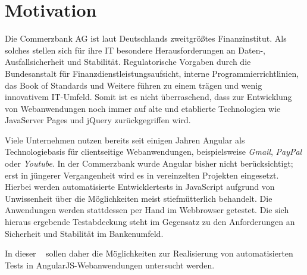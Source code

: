 \section{Motivation}\label{einleitung}
Die Commerzbank AG ist laut \textcite[][2]{handelsblatt:commerzbank} Deutschlands zweitgrößtes Finanzinstitut. Als solches stellen sich für ihre IT besondere Herausforderungen an Daten-, Ausfallsicherheit und Stabilität. Regulatorische Vorgaben durch die Bundesanstalt für Finanzdienstleistungsaufsicht\cite{bafin-banken}, interne Programmierrichtlinien\cite{coba-programmierrichtlinienAllgemein, coba-programmierrichtlinienJavaScript}, das Book of Standards \cite{coba-bookOfStandards} und Weitere führen zu einem trägen und wenig innovativem IT-Umfeld. Somit ist es nicht überraschend, dass zur Entwicklung von Webanwendungen noch immer auf alte und etablierte Technologien wie JavaServer Pages und jQuery zurückgegriffen wird.

Viele Unternehmen nutzen bereits seit einigen Jahren Angular als Technologiebasis für clientseitige Webanwendungen, beispielsweise \textit{Gmail}, \textit{PayPal} oder \textit{Youtube}. In der Commerzbank wurde Angular bisher nicht berücksichtigt; erst in jüngerer Vergangenheit wird es in vereinzelten Projekten eingesetzt. Hierbei werden automatisierte Entwicklertests in JavaScript aufgrund von Unwissenheit über die Möglichkeiten meist stiefmütterlich behandelt. Die Anwendungen werden stattdessen per Hand im Webbrowser getestet. Die sich hieraus ergebende Testabdeckung steht im Gegensatz zu den Anforderungen an Sicherheit und Stabilität im Bankenumfeld.

In dieser \titleDocument~ sollen daher die Möglichkeiten zur Realisierung von automatisierten Tests in AngularJS-Webanwendungen untersucht werden. 